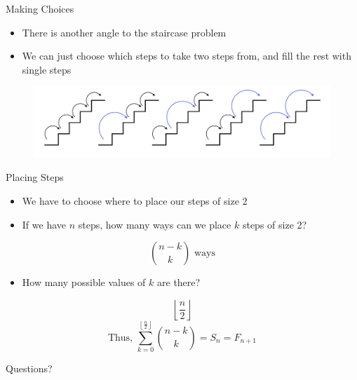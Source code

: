 \documentclass[aspectratio=169]{beamer}
\begin{document}
\begin{frame}{Making Choices}
    \begin{itemize}
        \item There is another angle to the staircase problem \pause
        \item We can just choose which steps to take two steps from, and fill the rest with single steps 
    \end{itemize}
    \begin{figure}
        \centering
        \includegraphics[scale=0.9]{staircase_choose.png}
    \end{figure}
\end{frame}

\begin{frame}{Placing Steps}
    \begin{itemize}
        \item We have to choose where to place our steps of size $2$
        \item If we have $n$ steps, how many ways can we place $k$ steps of size 2? \pause
    \end{itemize}
    \[
        \binom{n - k}{k} \text{ ways}
    \] \pause
    \begin{itemize}
        \item How many possible values of $k$ are there? \pause
    \end{itemize}
    \[
        \left\lfloor \frac{n}{2} \right\rfloor
    \] \pause
    \[
        \text{Thus, } \sum_{k = 0}^{\left\lfloor \frac{n}{2} \right\rfloor} \binom{n - k}{k} = S_n = F_{n + 1}
    \]
\end{frame}

\begin{frame}{}
      \begin{center}
    {\color{sigma@mainblue} \LARGE Questions?}
  \end{center}
\end{frame}
\end{document}
